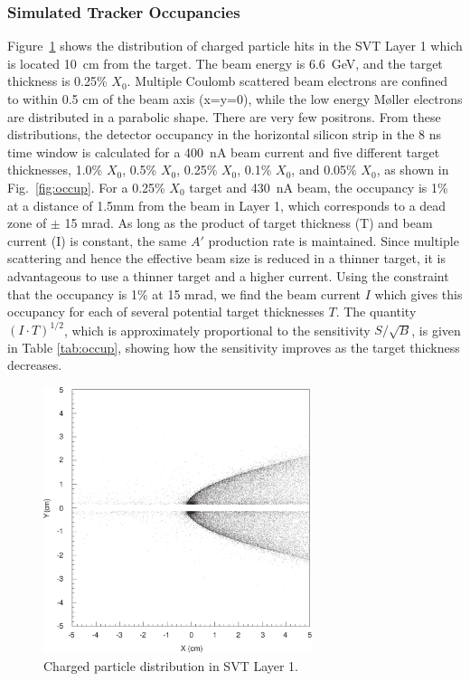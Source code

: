 \subsubsection{Simulated Tracker Occupancies}

Figure~\ref{fig:scatt} shows the distribution of charged particle hits in the SVT Layer 1 
which is located 
10~cm from the target. The beam energy is 6.6~GeV, and the target thickness is 
0.25\% $X_0$. Multiple Coulomb scattered beam electrons are confined to within 0.5 cm of the beam axis
(x=y=0), while the low energy M{\o}ller electrons are distributed in a parabolic shape. There are
very few positrons. From these distributions, the detector occupancy in the horizontal silicon strip
in the 8 ns time window is calculated for a 400~nA beam current and five different target
thicknesses, 1.0\% $X_0$, 0.5\% $X_0$, 0.25\% $X_0$, 0.1\% $X_0$, and 0.05\% $X_0$, as shown
in Fig.~\ref{fig:occup}. 
For a 0.25\% $X_0$ target and 430~nA beam, the occupancy is 
1\% at a distance of 1.5mm from the beam in Layer 1, which corresponds to a dead zone of $\pm$ 15
mrad. As long as the product of target thickness (T) and beam current (I) is constant, the same 
$A'$ production rate is maintained. Since multiple scattering and hence the effective beam size 
is reduced in a thinner target, it is advantageous to use a thinner target and a higher current.
Using the constraint that the occupancy is 1\% at 15 mrad, we find the beam current $I$ which 
gives this occupancy for each of several potential target thicknesses $T$. The quantity 
$(I\cdot T)^{1/2}$, which is approximately proportional to the sensitivity $S/\sqrt{B}$, is
given in Table \ref{tab:occup}, showing how the sensitivity improves as the target thickness 
decreases.

\begin{figure}[h]
\includegraphics[width= 0.7\textwidth]{performance/scatterplot.pdf}
\caption{\small{Charged particle distribution in SVT Layer 1.}}
\label{fig:scatt}
\end{figure}


